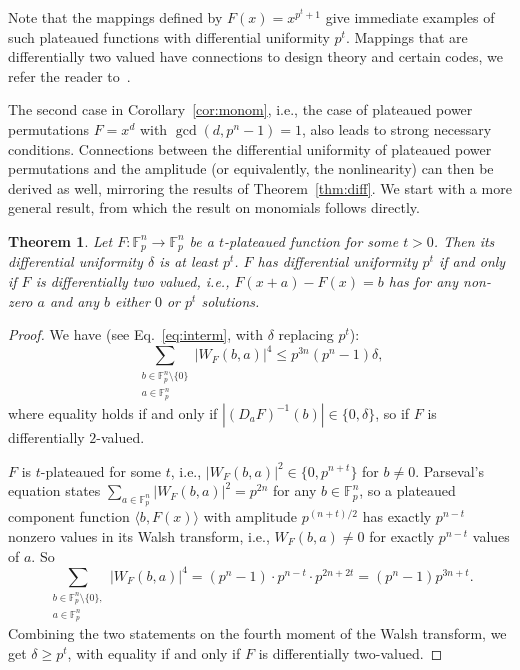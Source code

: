 \documentclass[11pt]{article}
\newcommand{\F}{\mathbb F}
\theoremstyle{plain}
\newtheorem{theorem}{Theorem}[section]
\theoremstyle{definition}
\numberwithin{theorem}{section}
\numberwithin{equation}{section}
\numberwithin{table}{section}
\numberwithin{figure}{section}
\begin{document}
{Note that the mappings defined by $F(x)=x^{p^t+1}$ give immediate examples of such plateaued functions with differential uniformity $p^t$. Mappings that are differentially two valued have connections to design theory and certain codes, we refer the reader to~\cite{tang2019codes}.


    
    The second case in Corollary~\ref{cor:monom}, i.e., the case of plateaued power permutations $F=x^d$ with $\gcd(d,p^n-1)=1$, also leads to strong necessary conditions. Connections between the differential uniformity of plateaued power permutations and the amplitude (or equivalently, the nonlinearity) can then be derived as well, mirroring the results of Theorem~\ref{thm:diff}. We start with a more general result, from which the result on monomials follows directly.

\begin{theorem} \label{thm:gcd1}
Let $F\colon \F_{p}^n\rightarrow \F_{p}^n$ be a $t$-plateaued function for some $t>0$.
    Then its differential uniformity $\delta$ is at least $p^t$. $F$ has differential uniformity $p^t$ if and only if $F$ is differentially two valued, i.e., $F(x+a)-F(x)=b$ has for any non-zero $a$ and any $b$ either $0$ or $p^t$ solutions.
\end{theorem}
\begin{proof}
    We have (see Eq.~\eqref{eq:interm}, with $\delta$ replacing $p^t$):
        \[\sum_{\substack{b \in \F_p^n\setminus\{0\}\\a \in \F_p^n}} |W_F(b,a)|^4 \leq p^{3n}(p^n-1)\delta,\]
    where equality holds if and only if $|(D_aF)^{-1}(b)| \in \{0,\delta\}$, so if $F$ is differentially $2$-valued.

    $F$ is $t$-plateaued for some $t$, i.e., $|W_F(b,a)|^2 \in \{0,p^{n+t}\}$ for $b\neq 0$. Parseval's equation states $\sum_{a \in \F_p^n}|W_F(b,a)|^2=p^{2n}$ for any $b \in \F_{p}^n$, so a plateaued component function $\langle b,F(x) \rangle$ with amplitude $p^{(n+t)/2}$ has exactly $p^{n-t}$ nonzero values in its Walsh transform, i.e., $W_F(b,a) \neq 0$ for exactly $p^{n-t}$ values of $a$. 
    So 
    \[\sum_{\substack{b \in \F_p^n\setminus\{0\},\\a \in \F_p^n}}  |W_F(b,a)|^4 = (p^n-1)\cdot p^{n-t}\cdot p^{2n+2t}=(p^n-1)p^{3n+t}.\]
    Combining the two statements on the fourth moment of the Walsh transform, we get $\delta \geq p^{t}$, with equality if and only if $F$ is differentially two-valued. 
\end{proof}

}
\end{document}
